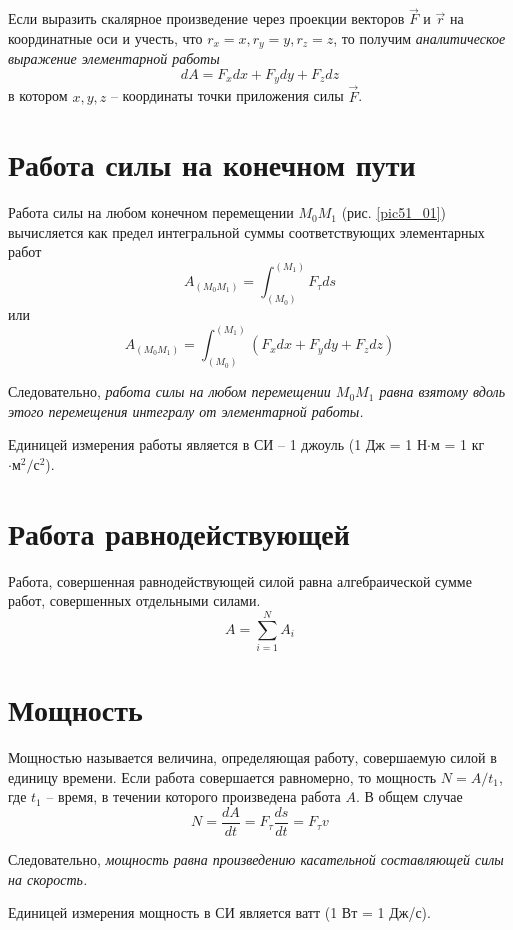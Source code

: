Если выразить скалярное произведение через проекции векторов \( \vec{F} \) 
и \( \vec{r} \) на координатные оси и учесть, что 
\( r_x = x, r_y = y, r_z = z \), то получим \emph{аналитическое выражение 
элементарной работы}
\[ dA = F_x dx + F_y dy + F_z dz \]
в котором \( x, y, z \) -- координаты точки приложения силы \( \vec{F} \).

\section{Работа силы на конечном пути}
Работа силы на любом конечном перемещении \( M_0 M_1 \) (рис. \ref{pic51_01}) 
вычисляется как предел интегральной суммы соответствующих элементарных 
работ 
\[ A_{(M_0 M_1)} = \int_{(M_0)}^{(M_1)} F_\tau ds \]
или 
\[ 
    A_{(M_0 M_1)} = \int_{(M_0)}^{(M_1)} 
    \left( F_x dx + F_y dy + F_z dz \right)
\]

Следовательно, \emph{работа силы на любом перемещении \( M_0 M_1 \) равна 
взятому вдоль этого перемещения интегралу от элементарной работы.}

Единицей измерения работы является в СИ -- 1 джоуль 
(1 Дж = 1 Н\( \cdot \)м = 1 кг \( \cdot\text{м}^2/\text{с}^2 \)).

\section{Работа равнодействующей}
Работа, совершенная равнодействующей силой равна алгебраической сумме 
работ, совершенных отдельными силами.
\[ A = \sum_{i=1}^{N} A_i \]

\section{Мощность}
Мощностью называется величина, определяющая работу, совершаемую силой 
в единицу времени. Если работа совершается равномерно, то мощность 
\( N = A/t_1 \), где \( t_1 \) -- время, в течении которого произведена 
работа \( A \). В общем случае
\[ N = \frac{dA}{dt} = F_\tau \frac{ds}{dt} = F_\tau v \]

Следовательно, \emph{мощность равна произведению касательной 
составляющей силы на скорость.}

Единицей измерения мощность в СИ является ватт (1 Вт = 1 Дж/с).

\newpage
